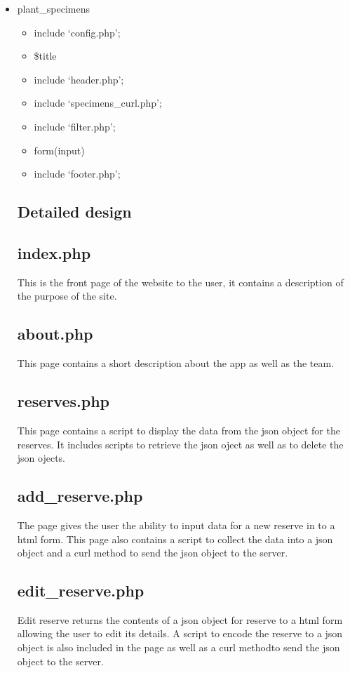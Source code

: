\begin{itemize}
		\item plant\_specimens
		\begin{itemize}
			\item include `config.php';
			\item \$title
			\item include `header.php';
			\item include `specimens\_curl.php';
			\item include `filter.php';
			\item form(input)
			\item include `footer.php';
		\end{itemize}


\subsection{Detailed design}

	\subsection{index.php}
		This is the front page of the website to the user, it contains a description of the purpose of the site.

		
	\subsection{about.php}
		This page contains a short description about the app as well as the team.

		
	\subsection{reserves.php}
		This page contains a script to display the data from the json object for the reserves. It includes scripts to retrieve the json oject as well as to delete the json ojects.

		
	\subsection{add\_reserve.php}
		The page gives the user the ability to input data for a new reserve in to a html form. This page also contains a script to collect the data into a json object and a curl method to send the json object to the server.

		
	\subsection{edit\_reserve.php}
		Edit reserve returns the contents of a json object for reserve to a html form allowing the user to edit its details. A script to encode the reserve to a json object is also included in the page as well as a curl methodto send the json object to the server.


\end{itemize}
